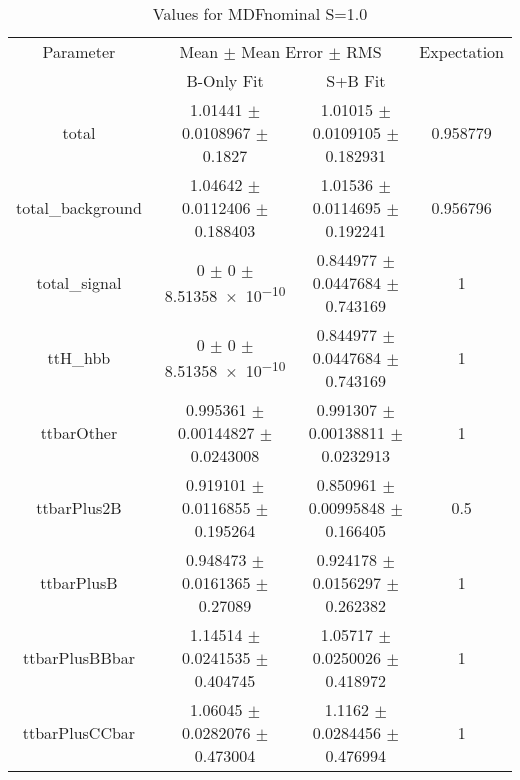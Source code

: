 \begin{table}
\centering
\caption{Values for MDFnominal S=1.0}
\begin{tabular}{cccc}
\toprule
Parameter & \multicolumn{2}{c}{Mean $\pm$ Mean Error $\pm$ RMS} & Expectation\\
 & B-Only Fit & S+B Fit & \\
\midrule
total & \num{1.01441} $\pm$ \num{0.0108967} $\pm$ \num{0.1827} & \num{1.01015} $\pm$ \num{0.0109105} $\pm$ \num{0.182931} & \num{0.958779}\\
total\_background & \num{1.04642} $\pm$ \num{0.0112406} $\pm$ \num{0.188403} & \num{1.01536} $\pm$ \num{0.0114695} $\pm$ \num{0.192241} & \num{0.956796}\\
total\_signal & \num{0} $\pm$ \num{0} $\pm$ \num{8.51358e-10} & \num{0.844977} $\pm$ \num{0.0447684} $\pm$ \num{0.743169} & \num{1}\\
ttH\_hbb & \num{0} $\pm$ \num{0} $\pm$ \num{8.51358e-10} & \num{0.844977} $\pm$ \num{0.0447684} $\pm$ \num{0.743169} & \num{1}\\
ttbarOther & \num{0.995361} $\pm$ \num{0.00144827} $\pm$ \num{0.0243008} & \num{0.991307} $\pm$ \num{0.00138811} $\pm$ \num{0.0232913} & \num{1}\\
ttbarPlus2B & \num{0.919101} $\pm$ \num{0.0116855} $\pm$ \num{0.195264} & \num{0.850961} $\pm$ \num{0.00995848} $\pm$ \num{0.166405} & \num{0.5}\\
ttbarPlusB & \num{0.948473} $\pm$ \num{0.0161365} $\pm$ \num{0.27089} & \num{0.924178} $\pm$ \num{0.0156297} $\pm$ \num{0.262382} & \num{1}\\
ttbarPlusBBbar & \num{1.14514} $\pm$ \num{0.0241535} $\pm$ \num{0.404745} & \num{1.05717} $\pm$ \num{0.0250026} $\pm$ \num{0.418972} & \num{1}\\
ttbarPlusCCbar & \num{1.06045} $\pm$ \num{0.0282076} $\pm$ \num{0.473004} & \num{1.1162} $\pm$ \num{0.0284456} $\pm$ \num{0.476994} & \num{1}\\
\bottomrule
\end{tabular}
\end{table}
